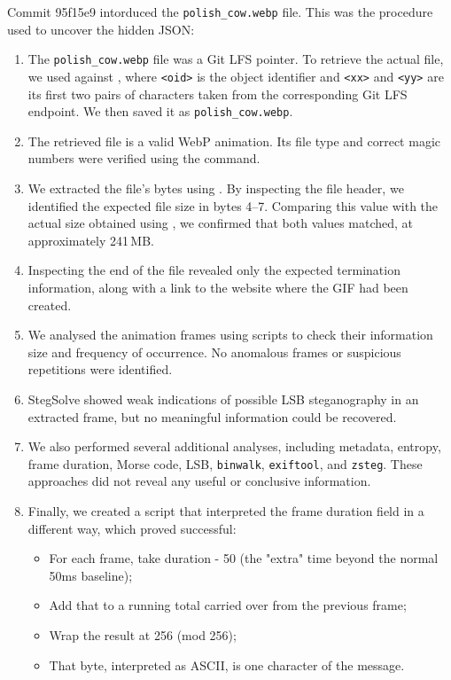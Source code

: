 \documentclass[11pt,a4paper,final,oneside]{article}
\begin{document}
\begin{itemize}
  Commit 95f15e9 intorduced the \texttt{polish\_cow.webp} file.  This was the procedure used to uncover the hidden JSON:
  \begin{enumerate}
    \item The \texttt{polish\_cow.webp} file was a Git LFS pointer. To retrieve the actual file, we used  against , where \texttt{<oid>} is the object identifier and \texttt{<xx>} and \texttt{<yy>} are its first two pairs of characters taken from the corresponding Git LFS endpoint. We then saved it as \texttt{polish\_cow.webp}.
    \item The retrieved file is a valid WebP animation. Its file type and correct magic numbers were verified using the  command.
    \item We extracted the file's bytes using . By inspecting the file header, we identified the expected file size in bytes 4--7. Comparing this value with the actual size obtained using , we confirmed that both values matched, at approximately 241\,MB.
    \item Inspecting the end of the file revealed only the expected termination information, along with a link to the website where the GIF had been created.
    \item We analysed the animation frames using scripts to check their information size and frequency of occurrence. No anomalous frames or suspicious repetitions were identified.
    \item StegSolve showed weak indications of possible LSB steganography in an extracted frame, but no meaningful information could be recovered.
    \item We also performed several additional analyses, including metadata, entropy, frame duration, Morse code, LSB, \texttt{binwalk}, \texttt{exiftool}, and \texttt{zsteg}. These approaches did not reveal any useful or conclusive information.
    \item Finally, we created a script that interpreted the frame duration field in a different way, which proved successful:
    \begin{itemize}
      \item For each frame, take duration - 50 (the "extra" time beyond the normal 50ms baseline);
      \item Add that to a running total carried over from the previous frame;
      \item Wrap the result at 256 (mod 256);
      \item That byte, interpreted as ASCII, is one character of the message.
    \end{itemize}
  \end{enumerate}


\end{itemize}
\end{document}
